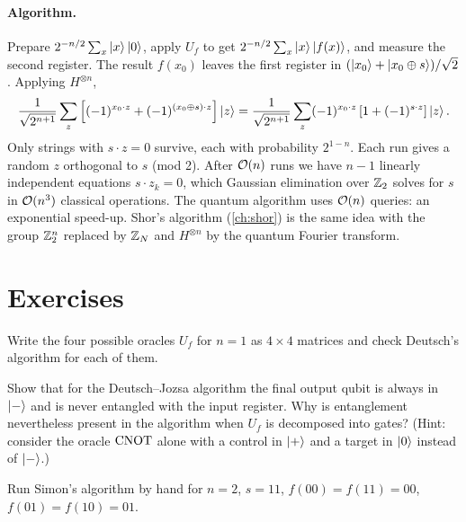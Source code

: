 \paragraph{Algorithm.} Prepare $2^{-n/2}\sum_x\left|x\right\rangle\left|0\right\rangle$, apply $U_f$ to get $2^{-n/2}\sum_x\left|x\right\rangle\left|f(x)\right\rangle$, and measure the second register. The result $f(x_0)$ leaves the first register in
$(\left|x_0\right\rangle+\left|x_0\oplus s\right\rangle)/\sqrt2$. Applying $H^{\otimes n}$,
\begin{equation}
  \frac1{\sqrt{2^{n+1}}}\sum_z\left[(-1)^{x_0\cdot z}+(-1)^{(x_0\oplus s)\cdot z}\right]\left|z\right\rangle=\frac1{\sqrt{2^{n+1}}}\sum_z(-1)^{x_0\cdot z}\left[1+(-1)^{s\cdot z}\right]\left|z\right\rangle .
\end{equation}
Only strings with $s\cdot z=0$ survive, each with probability $2^{1-n}$. Each run gives a random $z$ orthogonal to $s$ (mod 2). After $\mathcal O(n)$ runs we have $n-1$ linearly independent equations
$s\cdot z_k=0$, which Gaussian elimination over $\mathbb Z_2$ solves for $s$ in $\mathcal O(n^3)$ classical operations. The quantum algorithm uses $\mathcal O(n)$ queries: an exponential speed-up. Shor's algorithm
(\cref{ch:shor}) is the same idea with the group $\mathbb Z_2^n$ replaced by $\mathbb Z_N$ and $H^{\otimes n}$ by the quantum Fourier transform.

\section{Exercises}
\begin{exercise}
Write the four possible oracles $U_f$ for $n=1$ as $4\times4$ matrices and check Deutsch's algorithm for each of them.
\end{exercise}
\begin{exercise}
Show that for the Deutsch--Jozsa algorithm the final output qubit is always in $\left|-\right\rangle$ and is never entangled with the input register. Why is entanglement nevertheless present in the algorithm
when $U_f$ is decomposed into gates? (Hint: consider the oracle $\mathrm{CNOT}$ alone with a control in $\left|+\right\rangle$ and a target in $\left|0\right\rangle$ instead of $\left|-\right\rangle$.)
\end{exercise}
\begin{exercise}
Run Simon's algorithm by hand for $n=2$, $s=11$, $f(00)=f(11)=00$, $f(01)=f(10)=01$.
\end{exercise}
